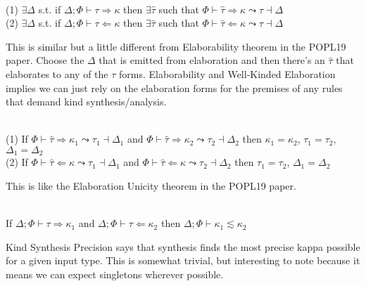 \documentclass[12pt,letterpaper]{article}
\newcommand{\elabAna}[5]{#1 \vdash #2 \Leftarrow #3 \leadsto #4 \dashv #5}
\newcommand{\elabSyn}[5]{#1 \vdash #2 \Rightarrow #3 \leadsto #4 \dashv #5}
\newcommand{\kconsubkind}[3]{#1 \vdash #2 \lesssim #3}
\newcommand{\kindSyn}[3]{#1 \vdash #2 \Rightarrow #3}
\newcommand{\kindAna}[3]{#1 \vdash #2 \Leftarrow #3}
\newcommand{\hPhi}{\Phi}
\newcommand{\htau}{\hat{\tau}}
\newcommand{\hkappa}{\kappa}
\newcommand{\dtau}{\tau}
\begin{document}
\begin{thm}[Elaborability]\ \\
	(1) $\exists \Delta$ s.t. if $\kindSyn{\Delta;\hPhi}{\dtau}{\hkappa}$ then $\exists \htau$ such that $\elabSyn{\hPhi}{\htau}{\hkappa}{\dtau}{\Delta}$ \\
	(2) $\exists \Delta$ s.t. if $\kindAna{\Delta;\hPhi}{\dtau}{\hkappa}$ then $\exists \htau$ such that $\elabAna{\hPhi}{\htau}{\hkappa}{\dtau}{\Delta}$
\end{thm}
\noindent
This is similar but a little different from Elaborability theorem in the POPL19 paper. Choose the $\Delta$ that is emitted from elaboration and then there's an $\htau$ that elaborates to any of the $\dtau$ forms. Elaborability and Well-Kinded Elaboration implies we can just rely on the elaboration forms for the premises of any rules that demand kind synthesis/analysis.

\begin{thm}\ \\
	(1) If $\elabSyn{\hPhi}{\htau}{\hkappa_1}{\dtau_1}{\Delta_1}$ and $\elabSyn{\hPhi}{\htau}{\hkappa_2}{\dtau_2}{\Delta_2}$ then $\hkappa_1 = \hkappa_2$, $\dtau_1 = \dtau_2$, $\Delta_1 = \Delta_2$ \\
	(2) If $\elabAna{\hPhi}{\htau}{\hkappa}{\dtau_1}{\Delta_1}$ and $\elabAna{\hPhi}{\htau}{\hkappa}{\dtau_2}{\Delta_2}$ then $\dtau_1 = \dtau_2$, $\Delta_1 = \Delta_2$
\end{thm}
\noindent
This is like the Elaboration Unicity theorem in the POPL19 paper.


\begin{thm}\ \\
	If $\kindSyn{\Delta;\hPhi}{\dtau}{\hkappa_1}$ and $\kindAna{\Delta;\hPhi}{\dtau}{\hkappa_2}$ then $\kconsubkind{\Delta;\hPhi}{\hkappa_1}{\hkappa_2}$
\end{thm}

\noindent
Kind Synthesis Precision says that synthesis finds the most precise kappa possible for a given input type. This is somewhat trivial, but interesting to note because it means we can expect singletons wherever possible.
\end{document}
